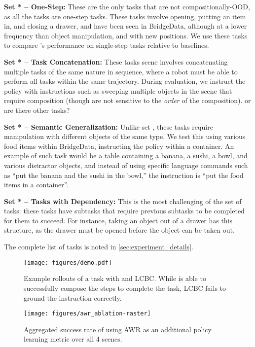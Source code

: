 \textbf{Set * -- One-Step:} These are the only tasks that are not compositionally-OOD, as all the tasks are one-step tasks.
These tasks involve opening, putting an item in, and closing a drawer, and
have been seen in BridgeData, although at a lower frequency than object manipulation, and with new positions.
We use these tasks to compare \Method{}'s performance on single-step tasks relative to baselines.

\textbf{Set * -- Task Concatenation:} These tasks scene involves concatenating multiple tasks of the same nature in sequence, where a robot must be able to perform all tasks within the same trajectory.
During evaluation, we instruct the policy with instructions such as sweeping multiple objects in the scene that require composition (though are not sensitive to the \emph{order} of the composition).
or are there other tasks?

\textbf{Set * -- Semantic Generalization:} Unlike set , these tasks require manipulation with different objects of the same type.
We test this using various food items within BridgeData, instructing the policy within a container.
An example of such task would be a table containing a banana, a sushi, a bowl, and various distractor objects, and instead of using specific language commands such as ``put the banana and the sushi in the bowl,'' the instruction is ``put the food items in a container''.

\textbf{Set * -- Tasks with Dependency:} This is the most challenging of the set of tasks: these tasks have subtasks that require previous subtasks to be completed for them to succeed.
For instance, taking an object out of a drawer has this structure, as the drawer must be opened before the object can be taken out.

The complete list of tasks is noted in \cref{sec:experiment_details}.

\begin{figure*}[htb]
    \centering
    \texttt{[image: figures/demo.pdf]}
    \caption{Example rollouts of a task with \Method{} and LCBC. While \Method{} is able to successfully compose the steps to complete the task, LCBC fails to ground the instruction correctly.}
        \label{fig:demos}

\end{figure*}

\begin{figure}
    \makeatletter
    \centering
    \texttt{[image: figures/awr\_ablation-raster]}
    \caption{Aggregated success rate of using AWR as an additional policy learning metric over all 4 scenes.}
    \label{fig:ablation-awr}
    \makeatother
\end{figure}

